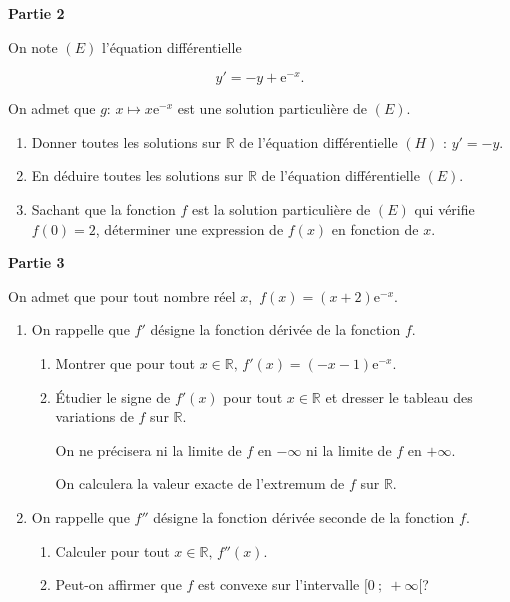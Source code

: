 \documentclass[10pt]{article}
\providecommand{\R}{\mathbb{R}}
\begin{document}
\begin{center}\textbf{Partie 2}\end{center}

On note $(E)$ l'équation différentielle 

\[y' = -y + \text{e}^{-x}.\]

On admet que $g :\,  x \longmapsto  x\text{e}^{-x}$ est une solution particulière de $(E)$.

\medskip

\begin{enumerate}
\item Donner toutes les solutions sur $\R$ de l'équation différentielle $(H)$ : 
$y' = -y$.
\item En déduire toutes les solutions sur $\R$ de l'équation différentielle $(E)$.
\item Sachant que la fonction $f$ est la solution particulière de $(E)$ qui vérifie $f(0) = 2$, déterminer une expression de $f(x)$ en fonction de $x$.
\end{enumerate}

\bigskip

\begin{center}\textbf{Partie 3}\end{center}

On admet que pour tout nombre réel $x$,\, $f(x) = (x + 2)\text{e}^{-x}$.

\medskip

\begin{enumerate}
\item On rappelle que $f'$ désigne la fonction dérivée de la fonction $f$.
	\begin{enumerate}
		\item Montrer que pour tout $x \in \R,\, f'(x) = (-x - 1) \text{e}^{-x}$.
		\item Étudier le signe de $f'(x)$ pour tout $x \in \R$ et dresser le tableau des variations de $f$ sur $\R$.

On ne précisera ni la limite de $f$ en $- \infty$ ni la limite de $f$ en $+ \infty$.

On calculera la valeur exacte de l'extremum de $f$ sur $\R$.
	\end{enumerate}
\item On rappelle que $f''$ désigne la fonction dérivée seconde de la fonction $f$.
	\begin{enumerate}
		\item Calculer pour tout $x \in \R,\, f''(x)$.
		\item Peut-on affirmer que $f$ est convexe sur l'intervalle $[0~;~+\infty[$?
	\end{enumerate}
\end{enumerate}

\bigskip
\end{document}
